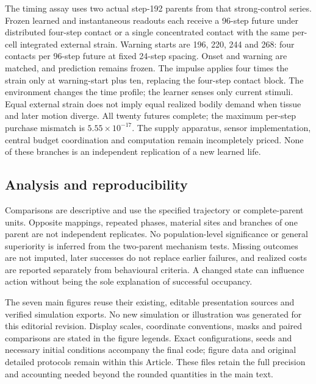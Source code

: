 The timing assay uses two actual step-192 parents from that strong-control series. Frozen learned and instantaneous readouts each receive a 96-step future under distributed four-step contact or a single concentrated contact with the same per-cell integrated external strain. Warning starts are 196, 220, 244 and 268: four contacts per 96-step future at fixed 24-step spacing. Onset and warning are matched, and prediction remains frozen. The impulse applies four times the strain only at warning-start plus ten, replacing the four-step contact block. The environment changes the time profile; the learner senses only current stimuli. Equal external strain does not imply equal realized bodily demand when tissue and later motion diverge. All twenty futures complete; the maximum per-step purchase mismatch is $5.55\times10^{-17}$. The supply apparatus, sensor implementation, central budget coordination and computation remain incompletely priced. None of these branches is an independent replication of a new learned life.

\subsection*{Analysis and reproducibility}
Comparisons are descriptive and use the specified trajectory or complete-parent units. Opposite mappings, repeated phases, material sites and branches of one parent are not independent replicates. No population-level significance or general superiority is inferred from the two-parent mechanism tests. Missing outcomes are not imputed, later successes do not replace earlier failures, and realized costs are reported separately from behavioural criteria. A changed state can influence action without being the sole explanation of successful occupancy.

The seven main figures reuse their existing, editable presentation sources and verified simulation exports. No new simulation or illustration was generated for this editorial revision. Display scales, coordinate conventions, masks and paired comparisons are stated in the figure legends. Exact configurations, seeds and necessary initial conditions accompany the final code; figure data and original detailed protocols remain within this Article. These files retain the full precision and accounting needed beyond the rounded quantities in the main text.
